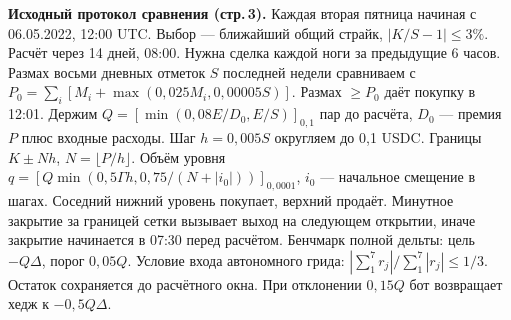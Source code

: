 \textbf{Исходный протокол сравнения (стр.\,3).} Каждая вторая пятница начиная с 06.05.2022, 12:00 UTC. Выбор --- ближайший общий страйк, $|K/S-1|\le3\%$. Расчёт через 14 дней, 08:00. Нужна сделка каждой ноги за предыдущие 6 часов. Размах восьми дневных отметок $S$ последней недели сравниваем с $P_0=\sum_i[M_i+\max(0{,}025M_i,0{,}00005S)]$. Размах $\ge P_0$ даёт покупку в 12:01. Держим $Q=[\min(0{,}08E/D_0,E/S)]_{0{,}1}$ пар до расчёта, $D_0$ --- премия $P$ плюс входные расходы. Шаг $h=0{,}005S$ округляем до 0,1 USDC. Границы $K\pm Nh$, $N=\lfloor P/h\rfloor$. Объём уровня $q=[Q\min(0{,}5\Gamma h,0{,}75/(N+|i_0|))]_{0{,}0001}$, $i_0$ --- начальное смещение в шагах. Соседний нижний уровень покупает, верхний продаёт. Минутное закрытие за границей сетки вызывает выход на следующем открытии, иначе закрытие начинается в 07:30 перед расчётом. Бенчмарк полной дельты: цель $-Q\Delta$, порог $0{,}05Q$. Условие входа автономного грида: $|\sum_1^7 r_j|/\sum_1^7|r_j|\le1/3$. Остаток сохраняется до расчётного окна. При отклонении $0{,}15Q$ бот возвращает хедж к $-0{,}5Q\Delta$.
\endgroup
